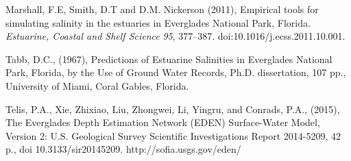 \begin{thebibliography}{}
Marshall, F.E, Smith, D.T and D.M. Nickerson (2011), Empirical tools for simulating salinity in the estuaries in Everglades National Park, Florida. \textit{Estuarine, Coastal and Shelf Science} \textit{95}, 377--387. doi:10.1016/j.ecss.2011.10.001.

Tabb, D.C., (1967), Predictions of Estuarine Salinities in Everglades National Park, Florida, by the Use of Ground Water Records, Ph.D. dissertation, 107 pp., University of Miami, Coral Gables, Florida.

Telis, P.A., Xie, Zhixiao, Liu, Zhongwei, Li, Yingru, and Conrads, P.A., (2015), The Everglades Depth Estimation Network (EDEN) Surface-Water Model, Version 2: U.S. Geological Survey Scientific Investigations Report 2014-5209, 42 p., doi 10.3133/sir20145209.  http://sofia.usgs.gov/eden/

\end{thebibliography}







\clearpage

